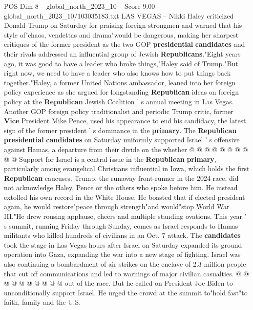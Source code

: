 \begin{textsample}{POS Dim 8 – global\_north\_2023\_10 – Score 9.00 – global\_north\_2023\_10/103035183.txt}  \label{ex:f8_pos_240}
LAS VEGAS -- Nikki Haley criticized Donald Trump on Saturday for praising foreign strongmen and warned that his style of"chaos, vendettas and drama"would be dangerous, making her sharpest critiques of the former president as the two GOP \textbf{presidential} \textbf{candidates} and their rivals addressed an influential group of Jewish \textbf{Republicans}."Eight years ago, it was good to have a leader who broke things,"Haley said of Trump."But right now, we need to have a leader who also knows how to put things back together."Haley, a former United Nations ambassador, leaned into her foreign policy experience as she argued for longstanding \textbf{Republican} ideas on foreign policy at the \textbf{Republican} Jewish Coalition ' s annual meeting in Las Vegas.
Another GOP foreign policy traditionalist and periodic Trump critic, former \textbf{Vice} President Mike Pence, used his appearance to end his candidacy, the latest sign of the former president ' s dominance in the \textbf{primary}.
The \textbf{Republican} \textbf{presidential} \textbf{candidates} on Saturday uniformly supported Israel ' s offensive against Hamas, a departure from their divide on the whether @ @ @ @ @ @ @ @ @ @ Support for Israel is a central issue in the \textbf{Republican} \textbf{primary}, particularly among evangelical Christians influential in Iowa, which holds the first \textbf{Republican} caucuses.
Trump, the runaway front-runner in the 2024 race, did not acknowledge Haley, Pence or the others who spoke before him.
He instead extolled his own record in the White House.
He boasted that if elected president again, he would restore"peace through strength"and would"stop World War III."He drew rousing applause, cheers and multiple standing ovations.
This year ' s summit, running Friday through Sunday, comes as Israel responds to Hamas militants who killed hundreds of civilians in an Oct. 7 attack.
The \textbf{candidates} took the stage in Las Vegas hours after Israel on Saturday expanded its ground operation into Gaza, expanding the war into a new stage of fighting.
Israel was also continuing a bombardment of air strikes on the enclave of 2.3 million people that cut off communications and led to warnings of major civilian casualties. @ @ @ @ @ @ @ @ @ @ out of the race.
But he called on President Joe Biden to unconditionally support Israel.
He urged the crowd at the summit to"hold fast"to faith, family and the U.S.

\end{textsample}
